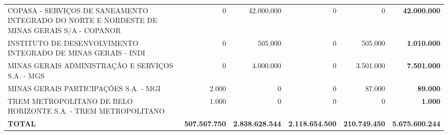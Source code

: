 \documentclass{article}
\begin{document}
\begin{longtable}[c]{m{5.5cm}|m{2.5cm}|m{2.5cm}|m{2.5cm}|m{2cm}|m{2cm}}
\multicolumn{1}{L{5.5cm}|}{COPASA - SERVIÇOS DE SANEAMENTO INTEGRADO DO NORTE E NORDESTE DE MINAS GERAIS S/A - COPANOR} & \multicolumn{1}{r|}{          0} & \multicolumn{1}{r|}{42.000.000} & \multicolumn{1}{r|}{            0} & \multicolumn{1}{r|}{          0} & \multicolumn{1}{r}{ \textbf{42.000.000}} \\
\multicolumn{1}{L{5.5cm}|}{INSTITUTO DE DESENVOLVIMENTO INTEGRADO DE MINAS GERAIS - INDI} & \multicolumn{1}{r|}{          0} & \multicolumn{1}{r|}{505.000} & \multicolumn{1}{r|}{            0} & \multicolumn{1}{r|}{505.000} & \multicolumn{1}{r}{ \textbf{1.010.000}} \\
\multicolumn{1}{L{5.5cm}|}{MINAS GERAIS ADMINISTRAÇÃO E SERVIÇOS S.A. - MGS} & \multicolumn{1}{r|}{          0} & \multicolumn{1}{r|}{4.000.000} & \multicolumn{1}{r|}{            0} & \multicolumn{1}{r|}{3.501.000} & \multicolumn{1}{r}{ \textbf{7.501.000}} \\
\multicolumn{1}{L{5.5cm}|}{MINAS GERAIS PARTICIPAÇÕES S.A. - MGI} & \multicolumn{1}{r|}{2.000} & \multicolumn{1}{r|}{            0} & \multicolumn{1}{r|}{            0} & \multicolumn{1}{r|}{87.000} & \multicolumn{1}{r}{ \textbf{89.000}} \\
\multicolumn{1}{L{5.5cm}|}{TREM METROPOLITANO DE BELO HORIZONTE S.A. - TREM METROPOLITANO} & \multicolumn{1}{r|}{1.000} & \multicolumn{1}{r|}{            0} & \multicolumn{1}{r|}{            0} & \multicolumn{1}{r|}{          0} & \multicolumn{1}{r}{ \textbf{1.000}} \\
\hline
\multicolumn{1}{L{5.5cm}|}{ \textbf{TOTAL}} & \multicolumn{1}{r|}{ \textbf{507.567.750}} & \multicolumn{1}{r|}{ \textbf{2.838.628.544}} & \multicolumn{1}{r|}{ \textbf{2.118.654.500}} & \multicolumn{1}{r|}{ \textbf{210.749.450}} & \multicolumn{1}{r}{ \textbf{5.675.600.244}} \\\end{longtable}
\end{document}

